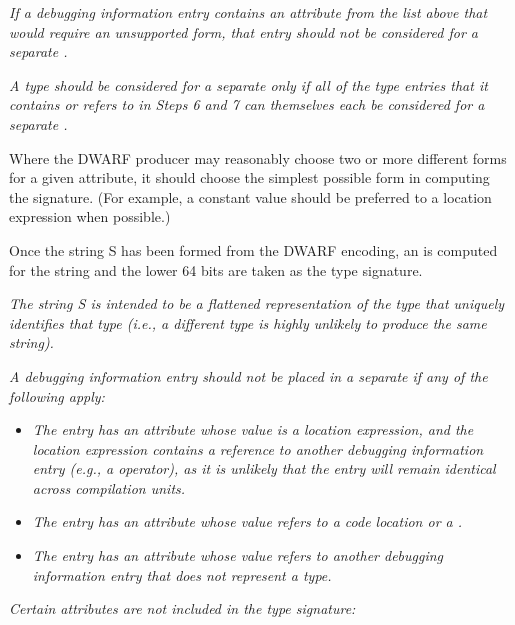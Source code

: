 \textit{If a debugging information entry contains an attribute from
the list above that would require an unsupported form, that
entry should not be considered for a separate 
.}

\textit{A type should be considered for a separate 
 only
if all of the type entries that it contains or refers to in
Steps 6 and 7 can themselves each be considered for a separate
.}

Where the DWARF producer may reasonably choose two or more
different forms for a given attribute, it should choose
the simplest possible form in computing the signature. (For
example, a constant value should be preferred to a location
expression when possible.)

Once the string S has been formed from the DWARF encoding,
an  is computed for the string and the lower 64 bits
are taken as the type signature.

\textit{The string S is intended to be a flattened representation of
the type that uniquely identifies that type (i.e., a different
type is highly unlikely to produce the same string).}

\textit{A debugging information entry should not be placed in a
separate 
if any of the following apply:}

\begin{itemize}

\item \textit{The entry has an attribute whose value is a location
expression, and the location expression contains a reference to
another debugging information entry (e.g., a 
operator), as it is unlikely that the entry will remain
identical across compilation units.}

\item \textit{The entry has an attribute whose value refers
to a code location or a .}

\item \textit{The entry has an attribute whose value refers
to another debugging information entry that does not represent
a type.}
\end{itemize}


\textit{Certain attributes are not included in the type signature:}

